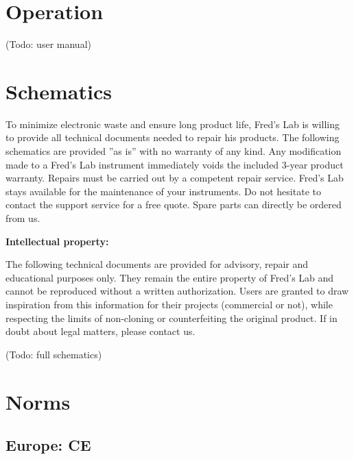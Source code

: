\documentclass{scrartcl}
\begin{document}
\pagebreak


\section{Operation}

 (Todo: user manual)


\section{Schematics}

To minimize electronic waste and ensure long product life, Fred’s Lab is willing to provide all technical documents needed to repair his products. The following schematics are provided ”as is” with no warranty of any kind. Any modification made to a Fred’s Lab instrument immediately voids the included 3-year product warranty. Repairs must be carried out by a competent repair service. Fred’s Lab stays available for the maintenance of your instruments. Do not hesitate to contact the support service for a free quote. Spare parts can directly be ordered from us.

\textbf{Intellectual property:}

The following technical documents are provided for advisory, repair and educational purposes only. They remain the entire property of Fred's Lab and cannot be reproduced without a written authorization. Users are granted to draw inspiration from this information for their projects (commercial or not), while respecting the limits of non-cloning or counterfeiting the original product. If in doubt about legal matters, please contact us.

\begin{center}
    (Todo: full schematics)
\end{center}
\pagebreak


\section{Norms}
\subsection{Europe: CE}
\end{document}
